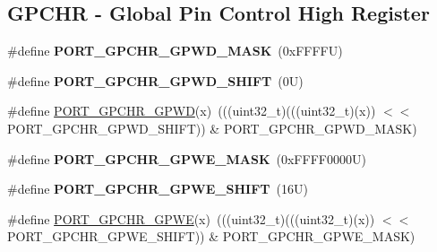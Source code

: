 \subsection*{G\+P\+C\+HR -\/ Global Pin Control High Register}
\begin{DoxyCompactItemize}
\item 
\mbox{\label{group___p_o_r_t___register___masks_ga4f288d1140184d41384f459c263d6e63}} 
\#define {\bfseries P\+O\+R\+T\+\_\+\+G\+P\+C\+H\+R\+\_\+\+G\+P\+W\+D\+\_\+\+M\+A\+SK}~(0x\+F\+F\+F\+F\+U)
\item 
\mbox{\label{group___p_o_r_t___register___masks_gab4464bb98b737fbf75d42682fef3c09c}} 
\#define {\bfseries P\+O\+R\+T\+\_\+\+G\+P\+C\+H\+R\+\_\+\+G\+P\+W\+D\+\_\+\+S\+H\+I\+FT}~(0\+U)
\item 
\#define \mbox{\hyperlink{group___p_o_r_t___register___masks_ga47cddb6551f05cf4810b6f7d96084540}{P\+O\+R\+T\+\_\+\+G\+P\+C\+H\+R\+\_\+\+G\+P\+WD}}(x)~(((uint32\+\_\+t)(((uint32\+\_\+t)(x)) $<$$<$ P\+O\+R\+T\+\_\+\+G\+P\+C\+H\+R\+\_\+\+G\+P\+W\+D\+\_\+\+S\+H\+I\+FT)) \& P\+O\+R\+T\+\_\+\+G\+P\+C\+H\+R\+\_\+\+G\+P\+W\+D\+\_\+\+M\+A\+SK)
\item 
\mbox{\label{group___p_o_r_t___register___masks_ga5e60b77e9d69fc09654c8034e31df7b5}} 
\#define {\bfseries P\+O\+R\+T\+\_\+\+G\+P\+C\+H\+R\+\_\+\+G\+P\+W\+E\+\_\+\+M\+A\+SK}~(0x\+F\+F\+F\+F0000\+U)
\item 
\mbox{\label{group___p_o_r_t___register___masks_gacbc69d159ff1e697736d296bbc95566d}} 
\#define {\bfseries P\+O\+R\+T\+\_\+\+G\+P\+C\+H\+R\+\_\+\+G\+P\+W\+E\+\_\+\+S\+H\+I\+FT}~(16\+U)
\item 
\#define \mbox{\hyperlink{group___p_o_r_t___register___masks_gac451ecefadd3d10c690199acf0540d6f}{P\+O\+R\+T\+\_\+\+G\+P\+C\+H\+R\+\_\+\+G\+P\+WE}}(x)~(((uint32\+\_\+t)(((uint32\+\_\+t)(x)) $<$$<$ P\+O\+R\+T\+\_\+\+G\+P\+C\+H\+R\+\_\+\+G\+P\+W\+E\+\_\+\+S\+H\+I\+FT)) \& P\+O\+R\+T\+\_\+\+G\+P\+C\+H\+R\+\_\+\+G\+P\+W\+E\+\_\+\+M\+A\+SK)
\end{DoxyCompactItemize}
